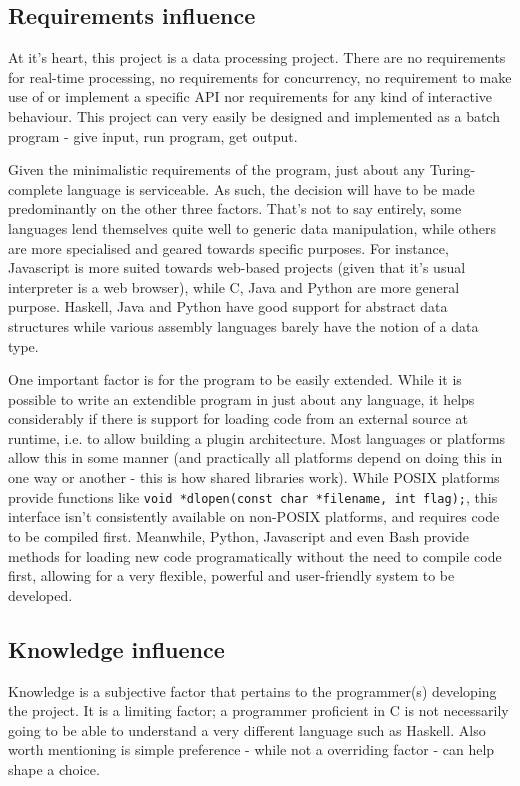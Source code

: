 \documentclass[10pt,a4paper,notitlepage]{report}
\begin{document}
\subsection{Requirements influence}
At it's heart, this project is a data processing project. There are no requirements for real-time processing, no requirements for concurrency, no requirement to make use of or implement a specific API nor requirements for any kind of interactive behaviour. This project can very easily be designed and implemented as a batch program - give input, run program, get output.

Given the minimalistic requirements of the program, just about any Turing-complete language is serviceable. As such, the decision will have to be made predominantly on the other three factors. That's not to say entirely, some languages lend themselves quite well to generic data manipulation, while others are more specialised and geared towards specific purposes. For instance, Javascript is more suited towards web-based projects (given that it's usual interpreter is a web browser), while C, Java and Python are more general purpose. Haskell, Java and Python have good support for abstract data structures while various assembly languages barely have the notion of a data type.

One important factor is for the program to be easily extended. While it is possible to write an extendible program in just about any language, it helps considerably if there is support for loading code from an external source at runtime, i.e. to allow building a plugin architecture.
Most languages or platforms allow this in some manner (and practically all platforms depend on doing this in one way or another - this is how shared libraries work). While POSIX platforms provide functions like \lstinline$void *dlopen(const char *filename, int flag);$, this interface isn't consistently available on non-POSIX platforms, and requires code to be compiled first. Meanwhile, Python, Javascript and even Bash provide methods for loading new code programatically without the need to compile code first, allowing for a very flexible, powerful and user-friendly system to be developed.

\subsection{Knowledge influence}
Knowledge is a subjective factor that pertains to the programmer(s) developing the project. It is a limiting factor; a programmer proficient in C is not necessarily going to be able to understand a very different language such as Haskell. Also worth mentioning is simple preference - while not a overriding factor - can help shape a choice.
\end{document}
